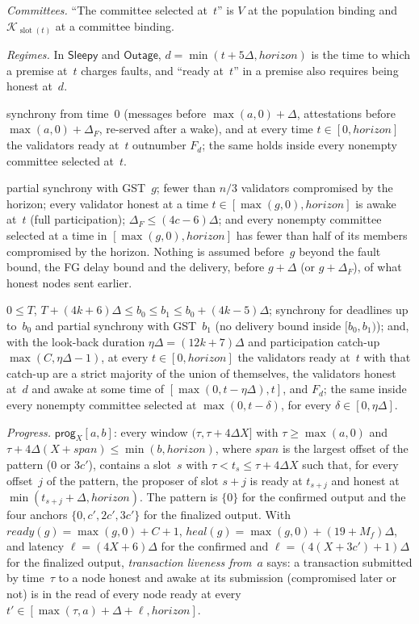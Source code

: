 \documentclass{article}
\newcommand{\slot}{\operatorname{slot}}
\begin{document}
\emph{Committees.}  ``The committee selected at~$t$'' is $V$ at the
population binding and $\mathcal K_{\slot(t)}$ at a committee binding.

\emph{Regimes.}  In $\mathsf{Sleepy}$ and $\mathsf{Outage}$,
$d=\min(t+5\Delta,\mathit{horizon})$ is the time to
which a premise at~$t$ charges faults, and ``ready at~$t$'' in a premise also
requires being honest at~$d$.
\begin{description}[itemsep=1pt]
\item[$\mathsf{Sleepy}$:] synchrony from time~$0$ (messages before
  $\max(a,0)+\Delta$, attestations before $\max(a,0)+\Delta_F$, re-served
  after a wake), and at every time $t\in[0,\mathit{horizon}]$ the validators
  ready at~$t$ outnumber $F_d$; the same holds inside every nonempty committee
  selected at~$t$.
\item[$\mathsf{Healthy}(g)$:] partial synchrony with GST~$g$; fewer than
  $n/3$ validators compromised by the horizon; every validator honest at a
  time $t\in[\max(g,0),\mathit{horizon}]$ is awake at~$t$ (full
  participation); $\Delta_F\leq(4c-6)\Delta$; and every nonempty committee
  selected at a time in $[\max(g,0),\mathit{horizon}]$ has fewer than half
  of its members compromised by the horizon.  Nothing is assumed before~$g$
  beyond the fault bound, the FG delay bound and the delivery, before
  $g+\Delta$ (or $g+\Delta_F$), of what honest nodes sent earlier.
\item[$\mathsf{Outage}(T,b_0,b_1)$:] $0\leq T$,
  $T+(4k+6)\Delta\leq b_0\leq b_1\leq b_0+(4k-5)\Delta$; synchrony for
  deadlines up to~$b_0$ and partial synchrony with GST~$b_1$ (no delivery
  bound inside $[b_0,b_1)$); and, with the look-back duration
  $\eta\Delta=(12k+7)\Delta$ and participation catch-up
  $\max(C,\eta\Delta-1)$, at every $t\in[0,\mathit{horizon}]$ the validators
  ready at~$t$ with that catch-up are a strict majority of the union of
  themselves, the validators honest at~$d$ and awake at some time of
  $[\max(0,t-\eta\Delta),t]$, and $F_d$; the same inside every nonempty
  committee selected at $\max(0,t-\delta)$, for every
  $\delta\in[0,\eta\Delta]$.
\end{description}

\emph{Progress.}  $\mathsf{prog}_X[a,b]$: every window
$(\tau,\tau+4\Delta X]$ with $\tau\geq\max(a,0)$ and
$\tau+4\Delta(X+\mathit{span})\leq\min(b,\mathit{horizon})$, where
$\mathit{span}$ is the largest offset of the pattern ($0$ or $3c'$), contains
a slot~$s$ with $\tau<t_s\leq\tau+4\Delta X$ such that, for every offset~$j$
of the pattern, the proposer of slot $s+j$ is ready at $t_{s+j}$ and honest
at $\min(t_{s+j}+\Delta,\mathit{horizon})$.  The pattern is $\{0\}$ for the
confirmed output and the four anchors $\{0,c',2c',3c'\}$ for the finalized
output.  With $\mathit{ready}(g)=\max(g,0)+C+1$,
$\mathit{heal}(g)=\max(g,0)+(19+M_f)\Delta$, and
latency $\ell=(4X+6)\Delta$ for the confirmed and
$\ell=(4(X+3c')+1)\Delta$ for the finalized output, \emph{transaction
liveness from~$a$} says: a transaction submitted by time~$\tau$ to a node
honest and awake at its submission (compromised later or not) is in the
read of every node ready at every
$t'\in[\max(\tau,a)+\Delta+\ell,\mathit{horizon}]$.
\end{document}
